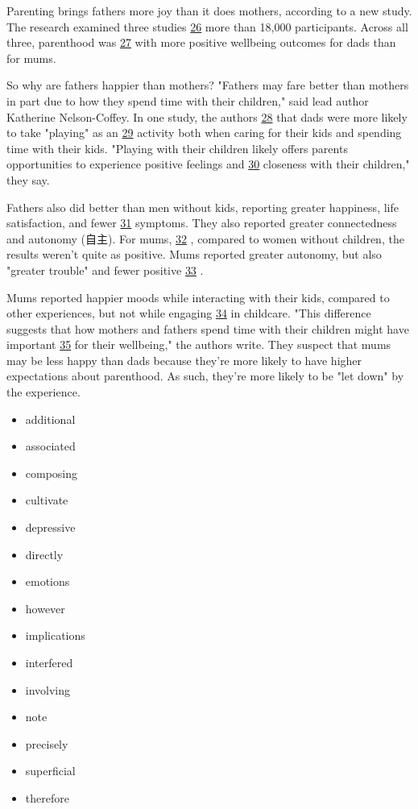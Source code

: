 \documentclass[UTF8,11pt]{ctexart}
\begin{document}
Parenting brings fathers more joy than it does mothers, according to a new study. The research examined three studies \uline{26} more than 18,000 participants. Across all three, parenthood was \uline{27} with more positive wellbeing outcomes for dads than for mums.


So why are fathers happier than mothers? "Fathers may fare better than mothers in part due to how they spend time with their children," said lead author Katherine Nelson-Coffey. In one study, the authors \uline{28} that dads were more likely to take "playing" as an \uline{29} activity both when caring for their kids and spending time with their kids. "Playing with their children likely offers parents opportunities to experience positive feelings and \uline{30} closeness with their children," they say.


Fathers also did better than men without kids, reporting greater happiness, life satisfaction, and fewer \uline{31} symptoms. They also reported greater connectedness and autonomy (自主). For mums, \uline{32} , compared to women without children, the results weren't quite as positive. Mums reported greater autonomy, but also "greater trouble" and fewer positive \uline{33} .


Mums reported happier moods while interacting with their kids, compared to other experiences, but not while engaging \uline{34} in childcare. "This difference suggests that how mothers and fathers spend time with their children might have important \uline{35} for their wellbeing," the authors write. They suspect that mums may be less happy than dads because they're more likely to have higher expectations about parenthood. As such, they're more likely to be "let down" by the experience.


\begin{itemize}[leftmargin=2em,itemsep=.2em,topsep=.4em]\item[A.] additional
\item[B.] associated
\item[C.] composing
\item[D.] cultivate
\item[E.] depressive
\item[F.] directly
\item[G.] emotions
\item[H.] however
\item[I.] implications
\item[J.] interfered
\item[K.] involving
\item[L.] note
\item[M.] precisely
\item[N.] superficial
\item[O.] therefore
\end{itemize}
\end{document}
